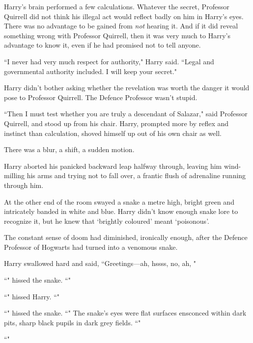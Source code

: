 Harry's brain performed a few calculations. Whatever the secret, Professor Quirrell did not think his illegal act would reflect badly on him in Harry's eyes. There was no advantage to be gained from \emph{not} hearing it. And if it did reveal something wrong with Professor Quirrell, then it was very much to Harry's advantage to know it, even if he had promised not to tell anyone.

``I never had very much respect for authority," Harry said. ``Legal and governmental authority included. I will keep your secret."

Harry didn't bother asking whether the revelation was worth the danger it would pose to Professor Quirrell. The Defence Professor wasn't stupid.

``Then I must test whether you are truly a descendant of Salazar," said Professor Quirrell, and stood up from his chair. Harry, prompted more by reflex and instinct than calculation, shoved himself up out of his own chair as well.

There was a blur, a shift, a sudden motion.

Harry aborted his panicked backward leap halfway through, leaving him wind-milling his arms and trying not to fall over, a frantic flush of adrenaline running through him.

At the other end of the room swayed a snake a metre high, bright green and intricately banded in white and blue. Harry didn't know enough snake lore to recognize it, but he knew that `brightly coloured' meant `poisonous'.

The constant sense of doom had diminished, ironically enough, after the Defence Professor of Hogwarts had turned into a venomous snake.

Harry swallowed hard and said, ``Greetings—ah, hssss, no, ah, "

``" hissed the snake. ``"

``" hissed Harry. ``"

``" hissed the snake. ``" The snake's eyes were flat surfaces ensconced within dark pits, sharp black pupils in dark grey fields. ``"

``"

